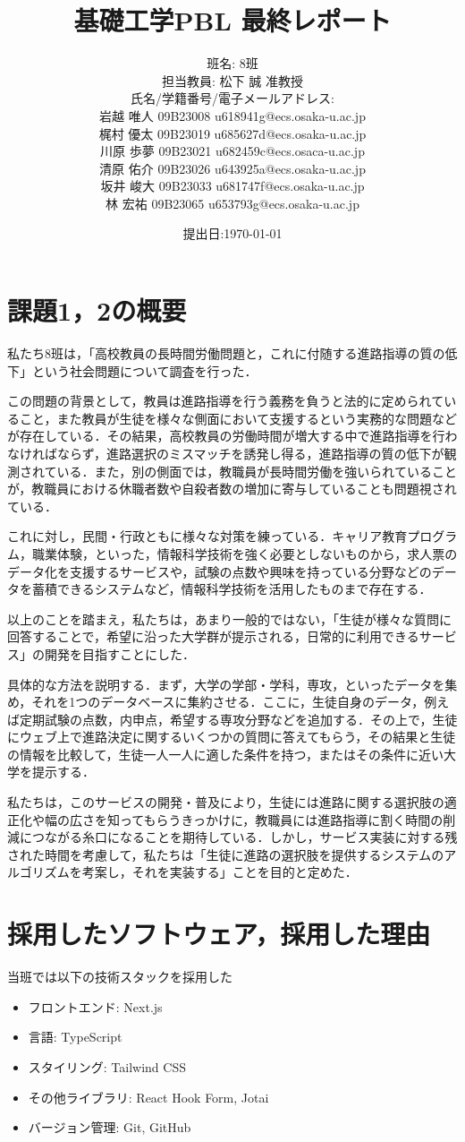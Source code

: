 \documentclass[a4j, titlepage]{jarticle}
\title{基礎工学PBL 最終レポート}
\author{班名: 8班\\
担当教員: 松下 誠 准教授\\
氏名/学籍番号/電子メールアドレス:\\
岩越 唯人 09B23008 u618941g@ecs.osaka-u.ac.jp\\
梶村 優太 09B23019 u685627d@ecs.osaka-u.ac.jp\\
川原 歩夢 09B23021 u682459c@ecs.osaca-u.ac.jp\\
清原 佑介 09B23026 u643925a@ecs.osaka-u.ac.jp\\
坂井 峻大 09B23033 u681747f@ecs.osaka-u.ac.jp\\
林 宏祐 09B23065 u653793g@ecs.osaka-u.ac.jp
}
\date{提出日:\today}
\begin{document}
\maketitle

\section{課題1，2の概要}
私たち8班は，「高校教員の長時間労働問題と，これに付随する進路指導の質の低下」という社会問題について調査を行った．

この問題の背景として，教員は進路指導を行う義務を負うと法的に定められていること，また教員が生徒を様々な側面において支援するという実務的な問題などが存在している．その結果，高校教員の労働時間が増大する中で進路指導を行わなければならず，進路選択のミスマッチを誘発し得る，進路指導の質の低下が観測されている．また，別の側面では，教職員が長時間労働を強いられていることが，教職員における休職者数や自殺者数の増加に寄与していることも問題視されている．

これに対し，民間・行政ともに様々な対策を練っている．キャリア教育プログラム，職業体験，といった，情報科学技術を強く必要としないものから，求人票のデータ化を支援するサービスや，試験の点数や興味を持っている分野などのデータを蓄積できるシステムなど，情報科学技術を活用したものまで存在する．

以上のことを踏まえ，私たちは，あまり一般的ではない，「生徒が様々な質問に回答することで，希望に沿った大学群が提示される，日常的に利用できるサービス」の開発を目指すことにした．

具体的な方法を説明する．まず，大学の学部・学科，専攻，といったデータを集め，それを1つのデータベースに集約させる．ここに，生徒自身のデータ，例えば定期試験の点数，内申点，希望する専攻分野などを追加する．その上で，生徒にウェブ上で進路決定に関するいくつかの質問に答えてもらう，その結果と生徒の情報を比較して，生徒一人一人に適した条件を持つ，またはその条件に近い大学を提示する．

私たちは，このサービスの開発・普及により，生徒には進路に関する選択肢の適正化や幅の広さを知ってもらうきっかけに，教職員には進路指導に割く時間の削減につながる糸口になることを期待している．しかし，サービス実装に対する残された時間を考慮して，私たちは「生徒に進路の選択肢を提供するシステムのアルゴリズムを考案し，それを実装する」ことを目的と定めた．

\section{採用したソフトウェア，採用した理由}
当班では以下の技術スタックを採用した
\begin{itemize}
\item フロントエンド: Next.js
\item 言語: TypeScript
\item スタイリング: Tailwind CSS
\item その他ライブラリ: React Hook Form, Jotai
\item バージョン管理: Git, GitHub
\end{itemize}
\end{document}
